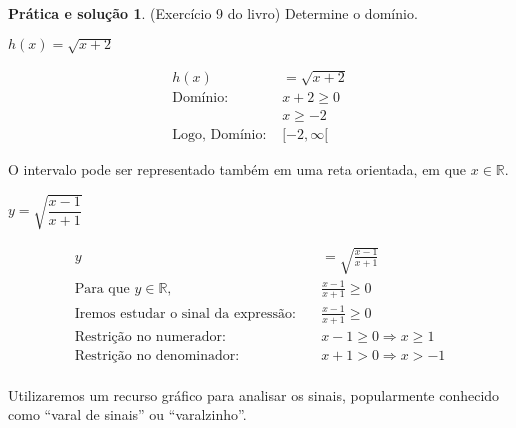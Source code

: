 \documentclass[12pt,openright,twoside,a4paper]{article}
\theoremstyle{definition}
\newtheorem{practice}{Prática e solução}[section]
\begin{document}
	\begin{practice}
		(Exercício 9 do livro) Determine o domínio.
		
		\item[e)] $h(x) = \sqrt{x + 2}$
		
		\begin{align*}
			h(x) &= \sqrt{x + 2} \\
			\text{Domínio: } & x + 2 \geq 0 \\
			& x \geq -2 \\
			\text{Logo, } \text{Domínio: } & [-2, \infty[
		\end{align*}
		
		O intervalo pode ser representado também em uma reta orientada, em que $x \in \mathbb{R}$.
		
		\begin{center}
		\end{center}
		\item[g)] $y = \sqrt{\dfrac{x - 1}{x + 1}}$
		
		\begin{align*}
			y &= \sqrt{\frac{x - 1}{x + 1}} \\
			\text{Para que } y \in \mathbb{R},\quad &\frac{x - 1}{x + 1} \geq 0 \\
			\text{Iremos estudar o sinal da expressão:} \quad &\frac{x - 1}{x + 1} \geq 0 \\
			\text{Restrição no numerador: } &x - 1 \geq 0 \Rightarrow x \geq 1 \\
			\text{Restrição no denominador: } &x + 1 > 0 \Rightarrow x > -1\\
		\end{align*}
		
		Utilizaremos um recurso gráfico para analisar os sinais, popularmente conhecido como ``varal de sinais'' ou ``varalzinho''. 
		

\end{practice}
\end{document}
